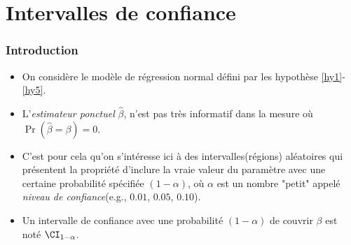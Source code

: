 \section{Intervalles de confiance}
\frame{\sectionpage}

\begin{frame}[allowframebreaks]\frametitle{Introduction}
\begin{itemize}
\item On considère le modèle de régression normal défini par les hypothèse \ref{hy1}-\ref{hy5}.
\item L'\emph{estimateur ponctuel} $\widehat{\beta}$, n'est pas très informatif dans la mesure où $\Pr(\widehat{\beta}=\beta)=0$. 
\item C'est pour cela qu'on s'intéresse ici à des intervalles(régions) aléatoires qui présentent la propriété d'inclure la vraie valeur du paramètre avec une certaine probabilité spécifiée $(1-\alpha)$, où $\alpha$ est un nombre "petit" appelé \emph{niveau de confiance}(e.g., $0.01$, $0.05$, $0.10$).
\item Un intervalle de confiance avec une probabilité  $(1-\alpha)$ de couvrir $\beta$ est noté $\CI_{1-\alpha}$.
\end{itemize}
\end{frame}

